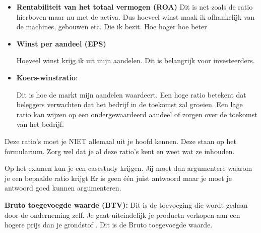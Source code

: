 \documentclass[a4paper,11pt]{article}
\begin{document}
\begin{description}
\begin{itemize}
        {Het heeft het rendement van een investering weer. Hoe presteren je investeringen?
        Hoeveel \% van mijn investering krijg ik extra terug.}

        \item \textbf{Rentabiliteit van het totaal vermogen (ROA)}
        {Dit is net zoals de ratio hierboven maar nu met de activa. Dus hoeveel winst
        maak ik afhankelijk van de machines, gebouwen etc. Die ik bezit.
        Hoe hoger hoe beter}

        \item \textbf{Winst per aandeel (EPS)}
        
        {Hoeveel winst krijg ik uit mijn aandelen. Dit is belangrijk voor investeerders.}

        \item \textbf{Koers-winstratio}:
        
        {Dit is hoe de markt mijn aandelen waardeert.
        Een hoge ratio betekent dat beleggers verwachten dat het bedrijf in de toekomst zal groeien.
        Een lage ratio kan wijzen op een ondergewaardeerd aandeel of zorgen over de toekomst van het bedrijf.}
    \end{itemize}

    \begin{examenbox}
        Deze ratio's moet je NIET allemaal uit je hoofd kennen.
        Deze staan op het formularium. Zorg wel dat je al deze ratio's kent
        en weet wat ze inhouden.
    \end{examenbox}

    \begin{examenbox}
        Op het examen kun je een casestudy krijgen.
        Jij moet dan argumentere waarom je een bepaalde ratio krijgt
        Er is geen één juist antwoord maar je moet
        je antwoord goed kunnen argumenteren.
    \end{examenbox}

\end{description}

\textbf{Bruto toegevoegde waarde (BTV):}
Dit is de toevoeging die wordt gedaan door de onderneming zelf.
Je gaat uiteindelijk je productn verkopen aan een hogere prijs dan je grondstof
. Dit is de Bruto toegevoegde waarde.
\end{document}
